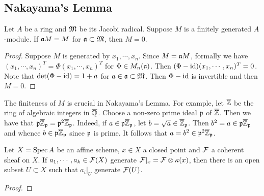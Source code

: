 \subsection{Nakayama's Lemma}

    \begin{theorem}\label{thm: Nakayama's lemma}
        Let $A$ be a ring and ${\mathfrak{M}}$ be its Jacobi radical.
        Suppose $M$ is a finitely generated $A$-module.
        If ${\mathfrak{a}} M = M$ for ${\mathfrak{a}} \subset {\mathfrak{M}}$, then $M = 0$.
    \end{theorem}
    \begin{proof}
        Suppose $M$ is generated by $x_1,\cdots,x_n$.
        Since $M = {\mathfrak{a}} M$, formally we have $(x_1,\cdots,x_n)^T = \Phi (x_1,\cdots, x_n)^T$ for $\Phi \in M_n({\mathfrak{a}})$.
        Then $(\Phi - {\operatorname{id}}) (x_1,\cdots, x_n)^T = 0$. 
        Note that $\det (\Phi - {\operatorname{id}}) = 1+a$ for $a \in {\mathfrak{a}} \subset {\mathfrak{M}}$.
        Then $\Phi-{\operatorname{id}}$ is invertible and then $M=0$.
    \end{proof}

    \begin{remark}\label{rem: counterexample of Nakayama's lemma when M is not finite}
        The finiteness of $M$ is crucial in Nakayama's Lemma.
        For example, let \(\overline{{\mathbb{Z}}}\) be the ring of algebraic integers in \(\overline{{\mathbb{Q}}}\).
        Choose a non-zero prime ideal \({\mathfrak{p}}\) of \(\overline{{\mathbb{Z}}}\).
        Then we have that \({\mathfrak{p}} \overline{{\mathbb{Z}}}_{\mathfrak{p}}= {\mathfrak{p}}^2 \overline{{\mathbb{Z}}}_{\mathfrak{p}}\).
        Indeed, if \(a \in {\mathfrak{p}} \overline{{\mathbb{Z}}}_{\mathfrak{p}}\), let \(b = \sqrt{a} \in \overline{{\mathbb{Z}}}_{\mathfrak{p}}\).
        Then \(b^2 = a \in {\mathfrak{p}} \overline{{\mathbb{Z}}}_{\mathfrak{p}}\) and whence \(b \in {\mathfrak{p}} \overline{{\mathbb{Z}}}_{\mathfrak{p}}\) since \({\mathfrak{p}}\) is prime.
        It follows that \(a = b^2 \in {\mathfrak{p}}^2 \overline{{\mathbb{Z}}}_{\mathfrak{p}}\).
    \end{remark}

    \begin{proposition}\label{prop: geometric form of Nakayama's lemma}
        Let $X = \operatorname{Spec} A$ be an affine scheme, $x\in X$ a closed point and ${\mathcal{F}}$ a coherent sheaf on $X$.
        If $a_1,\cdots,a_k \in {\mathcal{F}}(X)$ generate ${\mathcal{F}}|_x = {\mathcal{F}} \otimes {\kappa}(x)$, then there is an open subset $U \subset X$ such that $a_i|_U$ generate ${\mathcal{F}}(U)$. 
    \end{proposition}
    \begin{proof}
    \end{proof}

